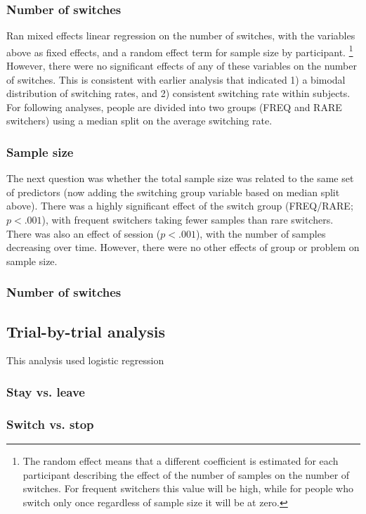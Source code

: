 \documentclass[english,doc]{apa}
\begin{document}
\subsubsection{Number of switches}

Ran mixed effects linear regression on the number of switches, with the variables above as fixed effects, and a random effect term for sample size by participant.
\footnote{The random effect means that a different coefficient is estimated for each participant describing the effect of the number of samples on the number of switches.
For frequent switchers this value will be high, while for people who switch only once regardless of sample size it will be at zero.}
However, there were no significant effects of any of these variables on the number of switches.
This is consistent with earlier analysis that indicated 1) a bimodal distribution of switching rates, and 2) consistent switching rate within subjects.
For following analyses, people are divided into two groups (FREQ and RARE switchers) using a median split on the average switching rate.


\subsubsection{Sample size}

The next question was whether the total sample size was related to the same set of predictors (now adding the switching group variable based on median split above).
There was a highly significant effect of the switch group (FREQ/RARE; $p<.001$), with frequent switchers taking fewer samples than rare switchers. 
There was also an effect of session ($p<.001$), with the number of samples decreasing over time. 
However, there were no other effects of group or problem on sample size.


\subsubsection{Number of switches}

\subsection{Trial-by-trial analysis}

This analysis used logistic regression 

\subsubsection{Stay vs. leave}


\subsubsection{Switch vs. stop}
\end{document}
